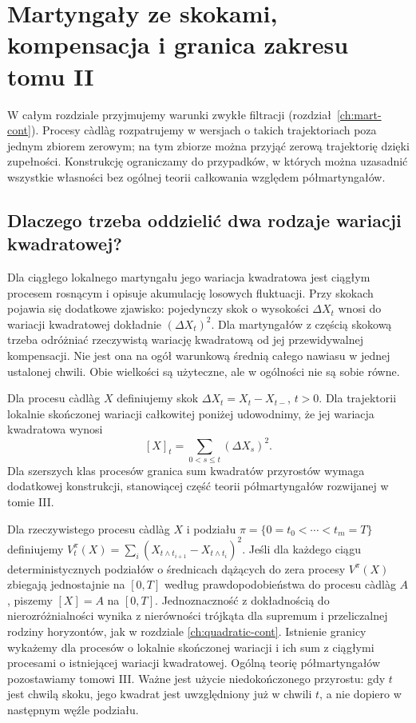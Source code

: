 \chapter{Martyngały ze skokami, kompensacja i granica zakresu tomu II}
\label{ch:jump-mart}

W całym rozdziale przyjmujemy warunki zwykłe filtracji
(rozdział~\ref{ch:mart-cont}). Procesy c\`adl\`ag
rozpatrujemy w wersjach o takich trajektoriach
poza jednym zbiorem zerowym; na tym zbiorze
można przyjąć zerową trajektorię dzięki zupełności.
Konstrukcję ograniczamy do przypadków, w których
można uzasadnić wszystkie własności bez ogólnej
teorii całkowania względem półmartyngałów.

\section{Dlaczego trzeba oddzielić dwa rodzaje wariacji kwadratowej?}
Dla ciągłego lokalnego martyngału jego wariacja kwadratowa
jest ciągłym procesem rosnącym i opisuje akumulację
losowych fluktuacji. Przy skokach pojawia się dodatkowe
zjawisko: pojedynczy skok o wysokości $\Delta X_t$
wnosi do wariacji kwadratowej dokładnie $(\Delta X_t)^2$.
Dla martyngałów z częścią skokową trzeba odróżniać
rzeczywistą wariację kwadratową od jej przewidywalnej
kompensacji. Nie jest ona na ogół warunkową średnią
całego nawiasu w jednej ustalonej chwili. Obie wielkości są użyteczne, ale w ogólności
nie są sobie równe.

\begin{definicja}
Dla procesu c\`adl\`ag $X$ definiujemy skok
$\Delta X_t=X_t-X_{t-}$, $t>0$. Dla trajektorii lokalnie skończonej wariacji
całkowitej poniżej udowodnimy, że jej wariacja
kwadratowa wynosi
\[
[X]_t=\sum_{0<s\le t}(\Delta X_s)^2.
\]
Dla szerszych klas procesów granica sum kwadratów
przyrostów wymaga dodatkowej konstrukcji, stanowiącej
część teorii półmartyngałów rozwijanej w tomie III.
\end{definicja}


\begin{definicja}
Dla rzeczywistego procesu c\`adl\`ag $X$ i podziału
$\pi=\{0=t_0<\cdots<t_m=T\}$ definiujemy
$V_t^\pi(X)=\sum_i(X_{t\wedge t_{i+1}}-X_{t\wedge t_i})^2$.
Jeśli dla każdego ciągu deterministycznych podziałów o
średnicach dążących do zera procesy $V^\pi(X)$ zbiegają
jednostajnie na $[0,T]$ według prawdopodobieństwa do
procesu c\`adl\`ag $A$, piszemy $[X]=A$ na $[0,T]$.
Jednoznaczność z dokładnością do nierozróżnialności
wynika z nierówności trójkąta dla supremum i
przeliczalnej rodziny horyzontów, jak w rozdziale
\ref{ch:quadratic-cont}.
Istnienie granicy wykażemy dla procesów o lokalnie
skończonej wariacji i ich sum z ciągłymi procesami
o istniejącej wariacji kwadratowej. Ogólną teorię
półmartyngałów pozostawiamy tomowi III.
Ważne jest użycie niedokończonego przyrostu:
gdy $t$ jest chwilą skoku, jego kwadrat jest
uwzględniony już w chwili $t$, a nie dopiero
w następnym węźle podziału.
\end{definicja}

